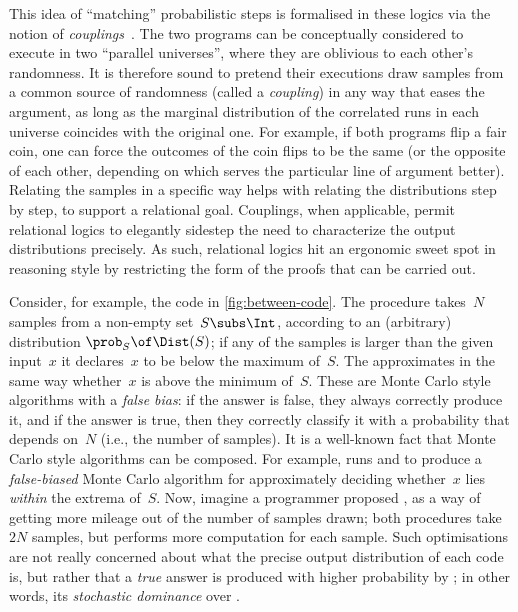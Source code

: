\documentclass[acmsmall,nonacm,screen,appendix]{acmart}
\begin{document}
This idea of ``matching'' probabilistic steps is formalised in these logics
via the notion of \emph{couplings}~\cite{barthe2009formal,barthe2015coupling}.
The two programs can be conceptually considered to execute in
two ``parallel universes'', where they are oblivious to each other's randomness.
It is therefore sound to pretend their executions draw samples from
a common source of randomness (called a \emph{coupling})
in any way that eases the argument,
as long as the marginal distribution of the correlated runs in each universe
coincides with the original one.
For example, if both programs flip a fair coin,
one can force the outcomes of the coin flips to be the same
(or the opposite of each other,
depending on which serves the particular line of argument better).
Relating the samples in a specific way helps with
relating the distributions step by step, to support a relational goal.
Couplings, when applicable, permit relational logics to elegantly sidestep
the need to characterize the output distributions precisely.
As such, relational logics hit an ergonomic sweet spot in reasoning style
by restricting the form of the proofs that can be carried out.




Consider, for example, the code in
\cref{fig:between-code}.
The  procedure takes~$N$ samples
from a non-empty set~$S \subs \Int$,
according to an (arbitrary) distribution $\prob_S \of \Dist(S)$;
if any of the samples is larger than the given input~$x$
it declares~$x$ to be below the maximum of~$S$.
The  approximates in the same way
whether~$x$ is above the minimum of~$S$.
These are Monte Carlo style algorithms with a \emph{false bias}:
if the answer is false, they always correctly produce it,
and if the answer is true, then they correctly classify it
with a probability that depends on~$N$
(i.e., the number of samples).
It is a well-known fact that Monte Carlo style algorithms can be composed.
For example,  runs
 and 
to produce a \emph{false-biased} Monte Carlo algorithm
for approximately deciding whether~$x$ lies \emph{within} the extrema of~$S$.
Now, imagine a programmer proposed ,
as a way of getting more mileage out of the number of samples drawn;
both procedures take~$2N$ samples,
but  performs more computation for each sample.
Such optimisations are not really concerned about
what the precise output distribution of each code is,
but rather that a \emph{true} answer is produced
with higher probability by ;
in other words, its \emph{stochastic dominance} over .
\end{document}
